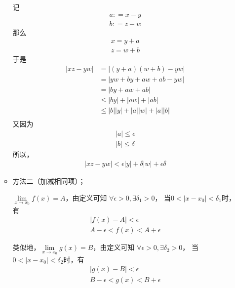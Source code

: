 \documentclass{article}
\begin{document}
\begin{itemize}
\begin{itemize}
\begin{zremark}
                  记
                  \begin{align*}
                    a : = x - y \\
                    b : = z - w
                  \end{align*}
                  那么
                  \begin{align*}
                    x = y + a \\
                    z = w + b
                  \end{align*}
                  于是
                  \begin{align*}
                    |xz - yw|
                     & = |(y + a)(w + b) - yw|       \\
                     & = |yw + by + aw + ab - yw|    \\
                     & = |by + aw + ab|              \\
                     & \leq |by| + |aw| + |ab|       \\
                     & \leq |b||y| + |a||w| + |a||b| \\
                  \end{align*}
                  又因为
                  \begin{align*}
                    |a| \leq \epsilon \\
                    |b| \leq \delta
                  \end{align*}
                  所以，
                  \begin{align*}
                    |xz - yw| < \epsilon|y| + \delta|w| + \epsilon \delta
                  \end{align*}
                \end{zremark}


          \item 方法二（加减相同项）；

                $\lim\limits_{x \to x_0} f(x) = A$，由定义可知
                $\forall \epsilon > 0, \exists \delta_1 > 0$，
                当$0 < |x - x_0| < \delta_1$时，有
                \begin{align*}
                  |f(x) - A| < \epsilon \\
                  A - \epsilon < f(x) < A + \epsilon
                \end{align*}

                类似地，$\lim\limits_{x \to x_0} g(x) = B$，由定义可知
                $\forall \epsilon > 0, \exists \delta_2 > 0$，
                当$0 < |x - x_0| < \delta_2$时，有
                \begin{align*}
                  |g(x) - B| < \epsilon \\
                  B - \epsilon < g(x) < B + \epsilon
                \end{align*}


\end{itemize}
\end{itemize}
\end{document}
